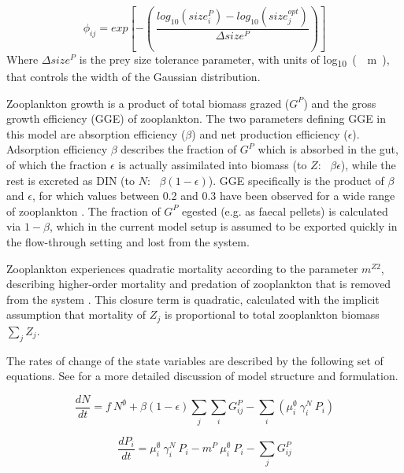 \documentclass[journal abbreviation, manuscript]{copernicus}
\begin{document}
\begin{equation}
    \phi_{ij} = exp \left[ -\left( \ \frac{ log_{10}(size_i^{P}) - log_{10}(size_j^{opt}) }{ \Delta size^{P} } \right) \right]
\end{equation}
Where $\Delta size^{P}$ is the prey size tolerance parameter, with units of \unit{log_{10}(\mu m)}, that controls the width of the Gaussian distribution.

Zooplankton growth is a product of total biomass grazed ($G^P$) and the gross growth efficiency (GGE) of zooplankton. The two parameters defining GGE in this model are absorption efficiency ($\beta$) and net production efficiency ($\epsilon$). Adsorption efficiency $\beta$ describes the fraction of $G^P$ which is absorbed in the gut, of which the fraction $\epsilon$ is actually assimilated into biomass (to $Z$: \ $\beta \epsilon$), while the rest is excreted as DIN (to $N$: \ $\beta (1-\epsilon)$). GGE specifically is the product of $\beta$ and $\epsilon$, for which values between 0.2 and 0.3 have been observed for a wide range of zooplankton  \citep{Straile1997GrossGroup}. The fraction of $G^P$ egested (e.g. as faecal pellets) is calculated via $1-\beta$, which in the current model setup is assumed to be exported quickly in the flow-through setting and lost from the system. 

Zooplankton experiences quadratic mortality according to the parameter $m^{Z2}$, describing higher-order mortality and predation of zooplankton that is removed from the system \citep{Edwards2000TheModels}. This closure term is quadratic, calculated with the implicit assumption that mortality of $Z_j$ is proportional to total zooplankton biomass $\sum_{j} Z_j$.


The rates of change of the state variables are described by the following set of equations. See \citet{Banas2011b} for a more detailed discussion of model structure and formulation.

\begin{equation}
    \frac{d N}{d t} = 
    f \ N^\emptyset %
    +  \beta (1 - \epsilon) \sum_{j} \sum_{i} G_{ij}^P %
    - \sum_{i} ( \mu_i^{\emptyset} \ \gamma_i^N \ P_i) %
\end{equation}

\begin{equation}
    \frac{d P_i}{d t} =
    \mu_i^{\emptyset} \  \gamma_i^N \   P_i  %
    - m^P  \ \mu_i^{\emptyset} \ P_i %
    - \sum_{j} G_{ij}^P %
\end{equation}
\end{document}
